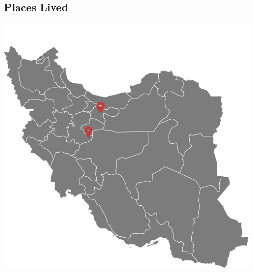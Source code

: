 \documentclass[a4paper]{friggeri-cv}
\begin{document}
\begin{aside}
  \section{Places Lived}
    \includegraphics[scale=0.5]{img/iran.png}
    ~
\end{aside}
~
\end{document}
